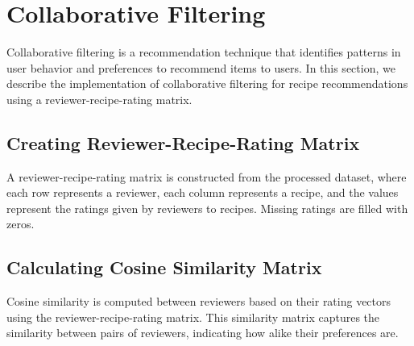 \documentclass[conference]{IEEEtran}
\begin{document}
\section{Collaborative Filtering}

Collaborative filtering is a recommendation technique that identifies patterns in user behavior and preferences to recommend items to users. In this section, we describe the implementation of collaborative filtering for recipe recommendations using a reviewer-recipe-rating matrix.

\subsection{Creating Reviewer-Recipe-Rating Matrix}

A reviewer-recipe-rating matrix is constructed from the processed dataset, where each row represents a reviewer, each column represents a recipe, and the values represent the ratings given by reviewers to recipes. Missing ratings are filled with zeros.

\begin{table}[H]
\centering
{}
\caption{Reviewer-Recipe-Rating Matrix (excerpt)}
\label{tab:reviewer_recipe_matrix}
\end{table}

\subsection{Calculating Cosine Similarity Matrix}

Cosine similarity is computed between reviewers based on their rating vectors using the reviewer-recipe-rating matrix. This similarity matrix captures the similarity between pairs of reviewers, indicating how alike their preferences are.
\end{document}
